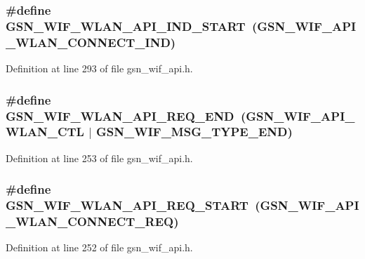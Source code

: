 \hypertarget{a00606_a50f545f68929ef78001e5172fa1b9feb}{
\subsubsection[{GSN\_\-WIF\_\-WLAN\_\-API\_\-IND\_\-START}]{\setlength{\rightskip}{0pt plus 5cm}\#define GSN\_\-WIF\_\-WLAN\_\-API\_\-IND\_\-START~(GSN\_\-WIF\_\-API\_\-WLAN\_\-CONNECT\_\-IND)}}
\label{a00606_a50f545f68929ef78001e5172fa1b9feb}


Definition at line 293 of file gsn\_\-wif\_\-api.h.

\hypertarget{a00606_a3725193a651ad127aa95e6cd4776142a}{
\subsubsection[{GSN\_\-WIF\_\-WLAN\_\-API\_\-REQ\_\-END}]{\setlength{\rightskip}{0pt plus 5cm}\#define GSN\_\-WIF\_\-WLAN\_\-API\_\-REQ\_\-END~(GSN\_\-WIF\_\-API\_\-WLAN\_\-CTL $|$ GSN\_\-WIF\_\-MSG\_\-TYPE\_\-END)}}
\label{a00606_a3725193a651ad127aa95e6cd4776142a}


Definition at line 253 of file gsn\_\-wif\_\-api.h.

\hypertarget{a00606_a6834e5d5979c600347ca1fb9bd01edcf}{
\subsubsection[{GSN\_\-WIF\_\-WLAN\_\-API\_\-REQ\_\-START}]{\setlength{\rightskip}{0pt plus 5cm}\#define GSN\_\-WIF\_\-WLAN\_\-API\_\-REQ\_\-START~(GSN\_\-WIF\_\-API\_\-WLAN\_\-CONNECT\_\-REQ)}}
\label{a00606_a6834e5d5979c600347ca1fb9bd01edcf}


Definition at line 252 of file gsn\_\-wif\_\-api.h.

